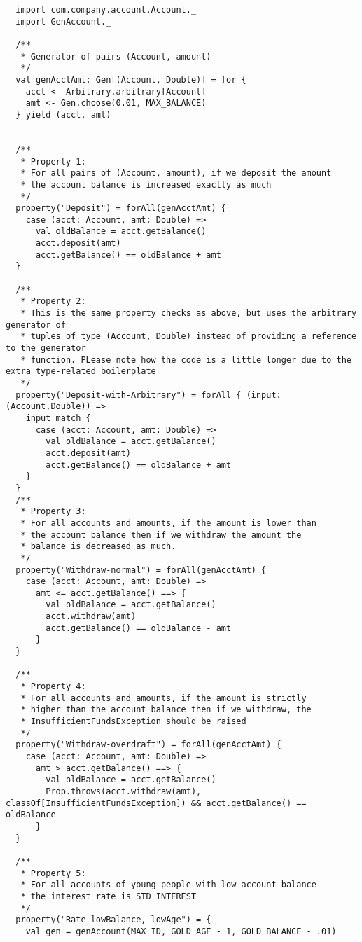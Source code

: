 \documentclass{article}
\begin{document}
\begin{lstlisting}
  import com.company.account.Account._
  import GenAccount._

  /**
   * Generator of pairs (Account, amount) 
   */
  val genAcctAmt: Gen[(Account, Double)] = for {
    acct <- Arbitrary.arbitrary[Account]
    amt <- Gen.choose(0.01, MAX_BALANCE)
  } yield (acct, amt)


  /**
   * Property 1:
   * For all pairs of (Account, amount), if we deposit the amount
   * the account balance is increased exactly as much 
   */
  property("Deposit") = forAll(genAcctAmt) {
    case (acct: Account, amt: Double) =>
      val oldBalance = acct.getBalance()
      acct.deposit(amt)
      acct.getBalance() == oldBalance + amt
  }

  /**
   * Property 2:
   * This is the same property checks as above, but uses the arbitrary generator of
   * tuples of type (Account, Double) instead of providing a reference to the generator
   * function. PLease note how the code is a little longer due to the extra type-related boilerplate
   */
  property("Deposit-with-Arbitrary") = forAll { (input:(Account,Double)) =>
    input match {
      case (acct: Account, amt: Double) =>
        val oldBalance = acct.getBalance()
        acct.deposit(amt)
        acct.getBalance() == oldBalance + amt
    }
  }
  /**
   * Property 3: 
   * For all accounts and amounts, if the amount is lower than 
   * the account balance then if we withdraw the amount the 
   * balance is decreased as much.  
   */
  property("Withdraw-normal") = forAll(genAcctAmt) {
    case (acct: Account, amt: Double) =>
      amt <= acct.getBalance() ==> {
        val oldBalance = acct.getBalance()
        acct.withdraw(amt)
        acct.getBalance() == oldBalance - amt
      }
  }

  /**
   * Property 4:
   * For all accounts and amounts, if the amount is strictly 
   * higher than the account balance then if we withdraw, the 
   * InsufficientFundsException should be raised
   */
  property("Withdraw-overdraft") = forAll(genAcctAmt) {
    case (acct: Account, amt: Double) =>
      amt > acct.getBalance() ==> {
        val oldBalance = acct.getBalance()
        Prop.throws(acct.withdraw(amt), classOf[InsufficientFundsException]) && acct.getBalance() == oldBalance
      }
  }

  /**
   * Property 5:
   * For all accounts of young people with low account balance
   * the interest rate is STD_INTEREST
   */
  property("Rate-lowBalance, lowAge") = {
    val gen = genAccount(MAX_ID, GOLD_AGE - 1, GOLD_BALANCE - .01)


\end{lstlisting}
\end{document}
